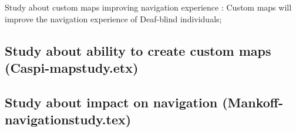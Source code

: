 Study about custom maps improving navigation experience : Custom maps will improve the navigation experience of Deaf-blind individuals;

\subsection{Study about ability to create custom maps (Caspi-mapstudy.etx)}


\subsection{Study about impact on navigation (Mankoff-navigationstudy.tex)}

